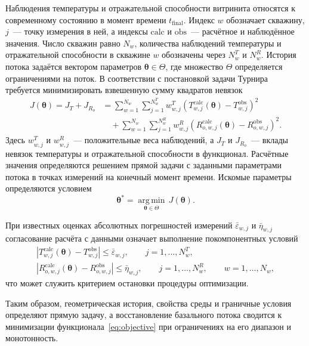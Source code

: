 Наблюдения температуры и отражательной способности витринита относятся к современному состоянию в момент времени $t_{\mathrm{final}}$. Индекс $w$ обозначает скважину, $j$~--- точку измерения в ней, а индексы $\mathrm{calc}$ и $\mathrm{obs}$~--- расчётное и наблюдённое значения. Число скважин равно $N_w$, количества наблюдений температуры и отражательной способности в скважине $w$ обозначены через $N_w^T$ и $N_w^R$. История потока задаётся вектором параметров $\boldsymbol\theta \in \Theta$, где множество $\Theta$ определяется ограничениями на поток. В соответствии с постановкой задачи Турнира~\cite{problem2026} требуется минимизировать взвешенную сумму квадратов невязок
\begin{equation}
 \begin{aligned}
 J(\boldsymbol\theta) = J_T + J_{R_o}
 &= \sum_{w=1}^{N_w} \sum_{j=1}^{N_w^T}
 w_{w,j}^T \left(T_{w,j}^{\mathrm{calc}}(\boldsymbol\theta) - T_{w,j}^{\mathrm{obs}}\right)^2\\
 &\quad + \sum_{w=1}^{N_w} \sum_{j=1}^{N_w^R}
 w_{w,j}^R \left(R_{o,w,j}^{\mathrm{calc}}(\boldsymbol\theta) - R_{o,w,j}^{\mathrm{obs}}\right)^2.
 \end{aligned}
 \label{eq:objective}
\end{equation}
Здесь $w_{w,j}^T$ и $w_{w,j}^R$~--- положительные веса наблюдений, а $J_T$ и $J_{R_o}$~--- вклады невязок температуры и отражательной способности в функционал. Расчётные значения определяются решением прямой задачи с заданными параметрами потока в точках измерений на конечный момент времени. Искомые параметры определяются условием
\begin{equation}
 \boldsymbol\theta^* = \underset{\boldsymbol\theta \in \Theta}{\operatorname{arg\,min}}\,J(\boldsymbol\theta).
\end{equation}

При известных оценках абсолютных погрешностей измерений $\bar\varepsilon_{w,j}$ и $\bar\eta_{w,j}$ согласование расчёта с данными означает выполнение покомпонентных условий
\begin{gather}
 \left|T_{w,j}^{\mathrm{calc}}(\boldsymbol\theta) - T_{w,j}^{\mathrm{obs}}\right|
 \leq \bar\varepsilon_{w,j},\qquad j = 1,\ldots,N_w^T,\\
 \left|R_{o,w,j}^{\mathrm{calc}}(\boldsymbol\theta) - R_{o,w,j}^{\mathrm{obs}}\right|
 \leq \bar\eta_{w,j},\qquad j = 1,\ldots,N_w^R,
 \qquad w = 1,\ldots,N_w,
 \label{eq:observation-errors}
\end{gather}
что может служить критерием остановки процедуры оптимизации.

Таким образом, геометрическая история, свойства среды и граничные условия определяют прямую задачу, а восстановление базального потока сводится к минимизации функционала~\eqref{eq:objective} при ограничениях на его диапазон и монотонность.
